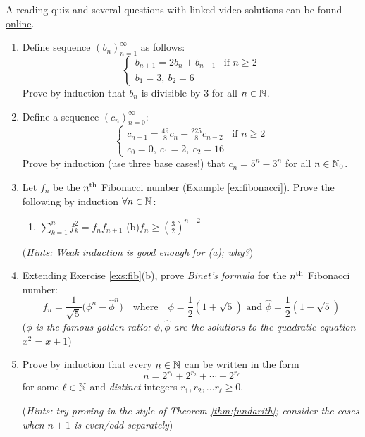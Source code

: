 \begin{exercises}{}{}
	A reading quiz and several questions with linked video solutions can be found \href{http://www.math.uci.edu/~ndonalds/math13/selftest/5-3-strongind.html}{online}.

	\begin{enumerate}  
  	\item Define sequence $(b_n)_{n=1}^\infty$ as follows:
  	\[
  		\begin{cases}
				b_{n+1}=2b_n+b_{n-1} &\text{if } n\ge 2\\
				b_1=3, \ b_2=6
			\end{cases}
		\]
		Prove by induction that $b_n$ is divisible by 3 for all $n\in\mathbb{N}$.
	
	
		\item\label{ex:ind3strong} Define a sequence $(c_n)_{n=0}^\infty$:
	 	\[
	 		\begin{cases}
				c_{n+1}=\frac{49}8c_n-\frac{225}8c_{n-2}&\text{if }n\ge 2\\
				c_0=0, \ c_1=2, \ c_2=16
			\end{cases}
		\]
		Prove by induction (use three base cases!) that $c_n=5^n-3^n$ for all $n\in\mathbb{N}_0$.
		
		
		\item\label{exs:fib} Let $f_n$ be the $n\textsuperscript{th}$ Fibonacci number (Example \ref{ex:fibonacci}). Prove the following by induction $\forall n\in\mathbb{N}$:
		\begin{enumerate}
		  \item $\sum\limits_{k=1}^nf_k^2=f_nf_{n+1}$ \qquad\qquad (b)\lstsp $f_n\ge\left(\frac 32\right)^{n-2}$
		\end{enumerate}
		(\emph{Hints: Weak induction is good enough for (a); why?})
	
	
		\goodbreak
		

	  \item\label{exs:fib2} Extending Exercise \ref{exs:fib}(b), prove \emph{Binet's formula} for the $n\textsuperscript{th}$ Fibonacci number:
	  \[
	  	f_n=\frac 1{\sqrt 5}\bigl(\phi^n-\hat\phi^n\bigr) \quad \text{where}\quad \phi=\frac 12(1+\sqrt{5})\text{ and } \hat\phi=\frac 12(1-\sqrt{5})
	  \]
		(\emph{$\phi$ is the famous \emph{golden ratio}: $\phi,\hat\phi$ are the solutions to the quadratic equation $x^2=x+1$})
  		
		
		\item Prove by induction that every $n\in\mathbb{N}$ can be written in the form
	  \[
	    n=2^{r_1}+2^{r_2}+\cdots+2^{r_\ell}
	  \]
	  for some $\ell\in\mathbb{N}$ and \emph{distinct} integers $r_1,r_2,\ldots r_\ell \ge 0$.\par
	  (\emph{Hints: try proving in the style of Theorem \ref{thm:fundarith}; consider the cases when $n+1$ is even/odd separately})
	

\end{enumerate}
\end{exercises}
